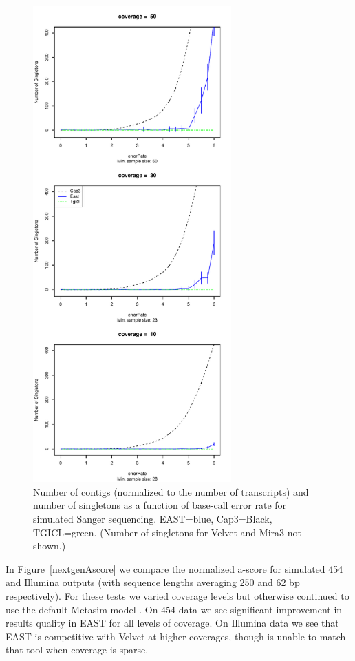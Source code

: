 \documentclass[10pt]{bmc_article}
\newcommand{\capthree} {{\small Cap3}}
\newcommand{\tgicl} {{\small TGICL}}
\newcommand{\east} {{\small EAST}}
\newcommand{\velvet}{{\small Velvet}}
\newcommand{\mira}{{\small Mira3}}
\newenvironment{bmcformat}{\begin{raggedright}\baselineskip20pt\sloppy\setboolean{publ}{false}}{\end{raggedright}\baselineskip20pt\sloppy}
\begin{document}
\begin{bmcformat}
\begin{figure}[htb]
\begin{minipage}{3in}
\includegraphics[width=3in]{pics.d/numSingle_sanger.pdf}
\end{minipage}
\caption{Number of contigs (normalized to the number of transcripts)
  and number of singletons as a function of base-call error
  rate for simulated Sanger sequencing.  \east=blue, \capthree=Black,
  \tgicl=green.  (Number of singletons for
  \velvet\/ and \mira\/ not shown.)}
\label{contigsSanger}
\end{figure}


 In
Figure~\ref{nextgenAscore} we compare the normalized a-score for
simulated 454 and Illumina outputs (with sequence lengths averaging
250 and 62 bp respectively).  For these tests we varied coverage
levels but otherwise continued to use the default Metasim model
\cite{Richter08}.  On 454 data we see significant improvement in
results quality in \east\/ for all levels of coverage.  On Illumina
data we see that \east\/ is competitive with \velvet\/ at higher
coverages, though is unable to match that tool when coverage is
sparse.


\end{bmcformat}
\end{document}

